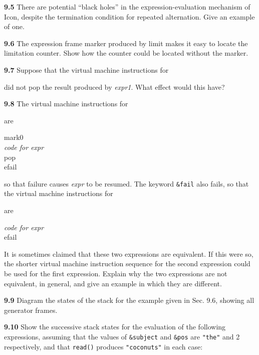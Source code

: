 \textbf{9.5} There are potential ``black holes'' in
the expression-evaluation mechanism of Icon, despite the termination
condition for repeated alternation. Give an example of one.

\textbf{9.6} The expression frame marker produced by limit makes it easy to
locate the limitation counter. Show how the counter could be located
without the marker.

\textbf{9.7} Suppose that the virtual machine instructions for


\noindent did not pop the result produced by \textit{expr1}. What
effect would this have?

\textbf{9.8} The virtual machine instructions for


are

\begin{iconcode}
\>mark0\\
\>\textit{code for expr}\\
\>pop\\
\>efail
\end{iconcode}

\noindent so that failure causes \textit{expr} to be resumed. The
keyword \texttt{\&fail} also fails, so that the virtual machine
instructions for


are

\begin{iconcode}
\>\textit{code for expr}\\
\>efail
\end{iconcode}

It is sometimes claimed that these two expressions are equivalent. If
this were so, the shorter virtual machine instruction sequence for the
second expression could be used for the first expression. Explain why
the two expressions are not equivalent, in general, and give an
example in which they are different.

\textbf{9.9} Diagram the states of the stack for the example given in
Sec. 9.6, showing all generator frames.

\textbf{9.10} Show the successive stack states for the evaluation of the
following expressions, assuming that the values of \texttt{\&subject}
and \texttt{\&pos} are \texttt{"the"} and
2 respectively, and that \texttt{read()} produces
\texttt{"coconuts"} in each case:

